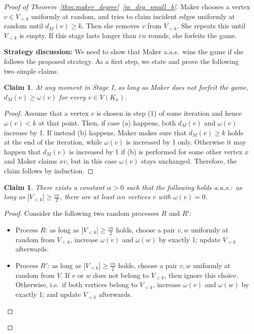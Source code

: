 \documentclass[11pt, a4paper]{article}
\numberwithin{equation}{section}
\numberwithin{figure}{section}
\newtheorem{claim}[theorem]{Claim}
\begin{document}
\begin{proof}[Proof of Theorem~\ref{thm:maker_degree}~\ref{m_deg_small_b}]
	Maker chooses a vertex $v\in V_{<k}$ uniformly at random,
	and tries to claim incident edges uniformly at random 
	until $d_M(v)\geq k$. Then she removes $v$ from $V_{<k}$.	
    She repeats this until $V_{<k}$ is empty.	
    If this stage lasts longer than $\varepsilon n$ rounds, 
    she forfeits the game.
	
	\bigskip
	
	{\bf Strategy discussion:} We need to show that Maker 
	a.a.s.~wins the game if she follows the proposed strategy. 
	As a first step, we state and prove the following two 
	simple claims.
	 	
	\begin{claim}\label{claim:omega-degree}
	At any moment in Stage I, 
	as long as Maker does not forfeit the game,
	$d_M(v)\geq \omega(v)$ for every $v\in V(K_n)$.	
	\end{claim}
	
	\begin{proof}
	Assume that a vertex $v$ is chosen in step (1)
	of some iteration and hence $\omega(v)<k$
	at that point. 
	Then, if case (a) happens, both $d_M(v)$ and 
	$\omega(v)$ increase by 1.
	If instead (b) happens, Maker makes sure that
	$d_M(v)\geq k$ holds at the end of the iteration,
	while $\omega(v)$ is increased by 1 only.
	Otherwise it may happen that $d_M(v)$
	is increased by 1 if (b) is performed for some 
	other vertex $x$ and Maker claims $xv$,
	but in this case $\omega(v)$ stays unchanged.
	Therefore, the claim follows by induction.
	\end{proof}
	
	\begin{claim}\label{clm:min-deg.process}
	There exists a constant $\alpha>0$ such that the following 
	holds a.a.s.:~as long as 
	$|V_{<k}|\geq \frac{\varepsilon n}{2}$, 
	there are at least $\alpha n$ vertices $v$ with
	$\omega(v)=0$.
	\end{claim}


\begin{proof}
Consider the following two random processes $R$ and $R'$:

\begin{itemize}
\item Process $R$:
as long as $|V_{<k}|\geq \frac{\varepsilon n}{2}$ holds,
choose a pair $v,w$ uniformly at random from
$V_{<k}$, increase $\omega(v)$ and $\omega(w)$ by exactly 1; update $V_{<k}$ afterwards.

\item Process $R'$:
as long as $|V_{<k}|\geq \frac{\varepsilon n}{2}$ holds,
choose a pair $v,w$ uniformly at random from
$V$. If $v$ or $w$ does not belong to $V_{<k}$, then ignore this choice. Otherwise, i.e.~if both vertices belong to $V_{<k}$, increase $\omega(v)$ and $\omega(w)$ by exactly 1; and update $V_{<k}$ afterwards.
\end{itemize} 


\end{proof}
\end{proof}
\end{document}
